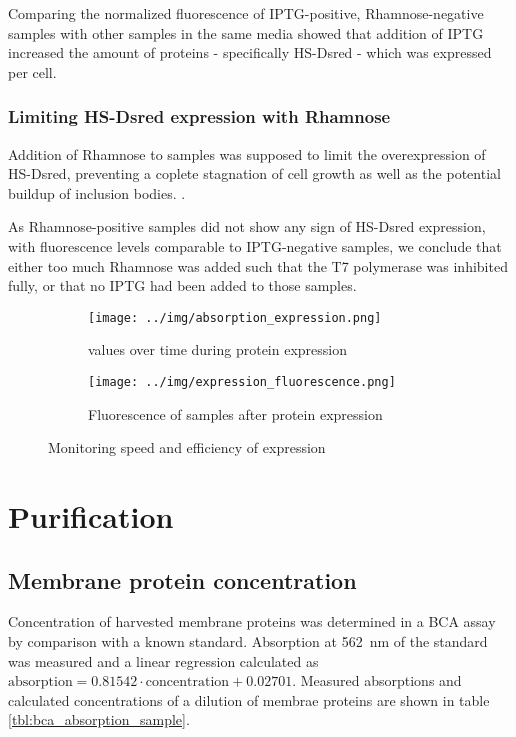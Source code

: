 Comparing the normalized fluorescence of IPTG-positive, Rhamnose-negative
samples with other samples in the same media showed that addition of IPTG
increased the amount of proteins - specifically HS-Dsred - which was expressed
per cell.

\subsubsection{Limiting HS-Dsred expression with Rhamnose}

Addition of Rhamnose to samples was supposed to limit the overexpression of
HS-Dsred, preventing a coplete stagnation of cell growth as well as the
potential buildup of inclusion bodies. \cite{memstar}.

As Rhamnose-positive samples did not show any sign of HS-Dsred expression, with
fluorescence levels comparable to IPTG-negative samples, we conclude that
either too much Rhamnose was added such that the T7 polymerase was inhibited
fully, or that no IPTG had been added to those samples.


\begin{figure}
	\centering
	\begin{subfigure}{\textwidth}
		\texttt{[image: ../img/absorption\_expression.png]}
		\caption{\odbact values over time during protein expression}
		\label{fig:absorption_expression}
	\end{subfigure}

	\begin{subfigure}{\textwidth}
		\centering
		\texttt{[image: ../img/expression\_fluorescence.png]}
		\caption{Fluorescence of samples after protein expression}
		\label{fig:fluorescence_expression}
	\end{subfigure}

	\caption{Monitoring speed and efficiency of expression}
	\label{fig:expression}
\end{figure}

\section{Purification}

\subsection{Membrane protein concentration}

Concentration of harvested membrane proteins was determined in a BCA assay by
comparison with a known standard. Absorption at \SI{562}{\nm} of the standard
was measured and a linear regression calculated as $\text{absorption} = 0.81542
\cdot \text{concentration} + 0.02701$. Measured absorptions and calculated
concentrations of a dilution of membrae proteins are shown in table
\ref{tbl:bca_absorption_sample}.

